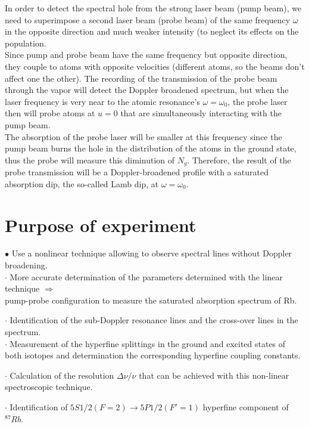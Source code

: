 \documentclass[openany,11pt,a4paper]{book}
\begin{document}
In order to detect the spectral hole from the strong laser beam (pump beam), we need to superimpose a second laser beam (probe beam) of the same frequency $\omega$ in the opposite direction and much weaker intensity (to neglect its effects on the population.\\

Since pump and probe beam have the same frequency but opposite direction, they couple to atoms with opposite velocities (different atoms, so the beams don't affect one the other).
The recording of the transmission of the probe beam through the vapor will detect the Doppler broadened spectrum, but when the laser frequency is very near to the atomic resonance's $\omega= \omega_{0}$, the probe laser then will probe atoms at $u=0$ that are simultaneously interacting with the pump beam.\\
The absorption of the probe laser will be smaller at this frequency since the pump beam burns the hole in the distribution of the atoms in the ground state, thus the probe will measure this diminution of $N_{g}$. Therefore, the result of the probe transmission will be a Doppler-broadened profile with a saturated absorption dip, the so-called Lamb dip, at $\omega=\omega_{0}$.

\section*{Purpose of experiment}
$\bullet$ Use a nonlinear technique allowing to observe spectral lines without Doppler broadening.\\

$\cdot$ More accurate determination of the parameters determined with the linear technique $\Rightarrow$\\

pump-probe configuration to measure the saturated absorption spectrum of Rb.

$\cdot$ Identification of the sub-Doppler resonance lines and the cross-over lines in the spectrum.\\

$\cdot$ Measurement of the hyperfine splittings in the ground and excited states of both isotopes and
determination the corresponding hyperfine coupling constants.

$\cdot$ Calculation of the resolution $\Delta \nu / \nu$ that can be achieved with this non-linear spectroscopic technique.

$\cdot$ Identification of $5S1/2(F = 2) → 5P1/2(F′ = 1)$ hyperfine component of $^{87}Rb$.
\end{document}

